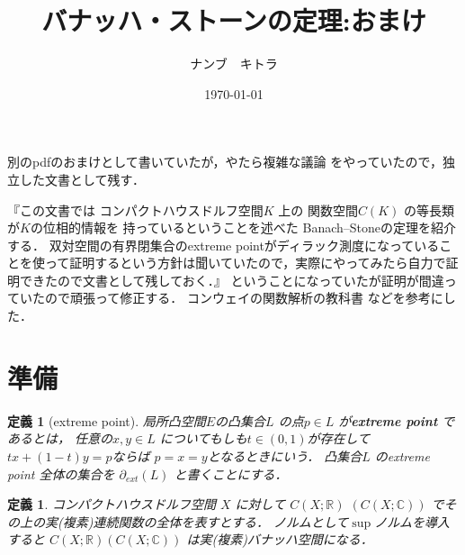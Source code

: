 \documentclass[leqno, a4paper, 12pt]{jsarticle}
\title{バナッハ・ストーンの定理:おまけ}
\author{ナンブ　キトラ}
\date{\today}
\newtheorem{df}[thm]{定義}
\newcommand{\rr}{\mathbb{R}}
\newcommand{\cc}{\mathbb{C}}
\newcommand{\myextreme}[1]{\partial_{ext}(#1)}
\begin{document}
\maketitle




別のpdfのおまけとして書いていたが，やたら複雑な議論
をやっていたので，独立した文書として残す．


『この文書では
コンパクトハウスドルフ空間$K$
上の
関数空間$C(K)$
の等長類が$K$の位相的情報を
持っているということを述べた
Banach--Stoneの定理を紹介する．
双対空間の有界閉集合のextreme pointがディラック測度になっていることを使って証明するという方針は聞いていたので，実際にやってみたら自力で証明できたので文書として残しておく．』
ということになっていたが証明が間違っていたので頑張って修正する．
コンウェイの関数解析の教科書\cite{con}
などを参考にした．


\section{準備}


\begin{df}[extreme point]
局所凸空間$E$の凸集合$L$
の点$p\in L$
が\textbf{extreme point}
であるとは，
任意の$x, y\in L$
についてもしも$t\in (0, 1)$が存在して
$tx+(1-t)y=p$ならば
$p=x=y$となるときにいう．
凸集合$L$
のextreme point 全体の集合を
$\myextreme{L}$
と書くことにする．
\end{df}


\begin{df}
コンパクトハウスドルフ空間
$X$
に対して
$C(X; \rr)$ $(C(X; \cc))$
でその上の実(複素)連続関数の全体を表すとする．
ノルムとして$\sup$ノルムを導入すると
$C(X; \rr)$$(C(X; \cc))$
は実(複素)バナッハ空間になる．
\end{df}
\end{document}
